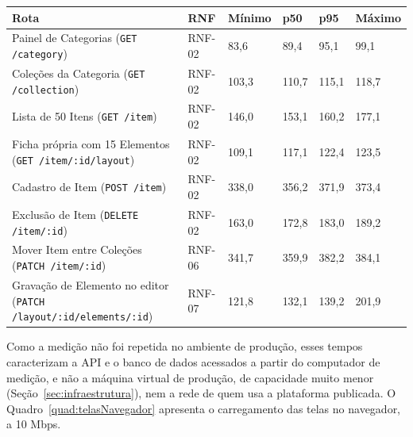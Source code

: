 \FloatBarrier
\begin{quadro}[h!]
\caption{Tempo de resposta da API, em milissegundos (n = 50 por rota)}
\label{quad:latenciaApi}
\footnotesize
\begin{tabular}{|p{6.0cm}|p{1.3cm}|p{1.4cm}|p{1.3cm}|p{1.3cm}|p{1.4cm}|}
\hline
\textbf{Rota} & \textbf{RNF} & \textbf{Mínimo} & \textbf{p50} & \textbf{p95} & \textbf{Máximo} \\ \hline
Painel de Categorias (\texttt{GET /category}) & RNF-02 & 83,6 & 89,4 & 95,1 & 99,1 \\ \hline
Coleções da Categoria (\texttt{GET /collection}) & RNF-02 & 103,3 & 110,7 & 115,1 & 118,7 \\ \hline
Lista de 50 Itens (\texttt{GET /item}) & RNF-02 & 146,0 & 153,1 & 160,2 & 177,1 \\ \hline
Ficha própria com 15 Elementos (\texttt{GET /item/:id/layout}) & RNF-02 & 109,1 & 117,1 & 122,4 & 123,5 \\ \hline
Cadastro de Item (\texttt{POST /item}) & RNF-02 & 338,0 & 356,2 & 371,9 & 373,4 \\ \hline
Exclusão de Item (\texttt{DELETE /item/:id}) & RNF-02 & 163,0 & 172,8 & 183,0 & 189,2 \\ \hline
Mover Item entre Coleções (\texttt{PATCH /item/:id}) & RNF-06 & 341,7 & 359,9 & 382,2 & 384,1 \\ \hline
Gravação de Elemento no editor (\texttt{PATCH /layout/:id/elements/:id}) & RNF-07 & 121,8 & 132,1 & 139,2 & 201,9 \\ \hline
\end{tabular}
\end{quadro}
\FloatBarrier

Como a medição não foi repetida no ambiente de produção, esses tempos caracterizam a API e o banco de dados acessados a partir do computador de medição, e não a máquina virtual de produção, de capacidade muito menor (Seção~\ref{sec:infraestrutura}), nem a rede de quem usa a plataforma publicada. O Quadro~\ref{quad:telasNavegador} apresenta o carregamento das telas no navegador, a 10 Mbps.

